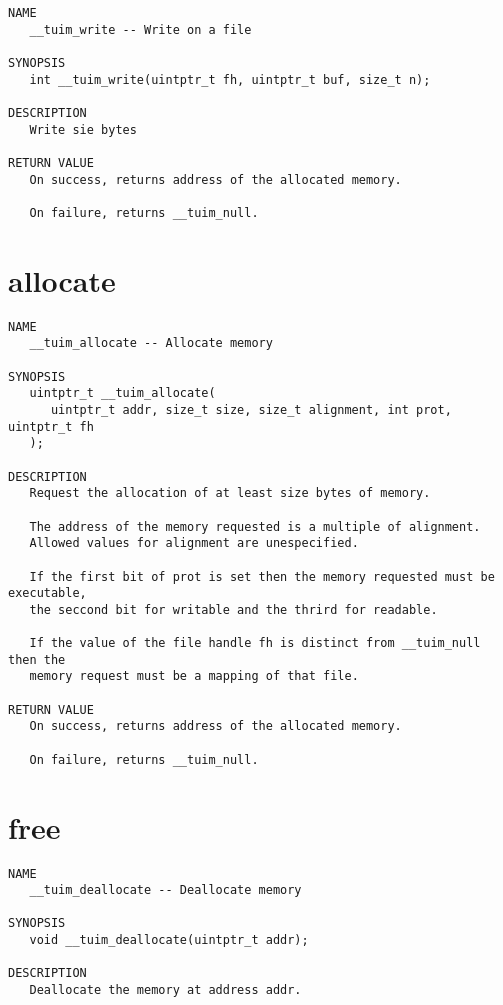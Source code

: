 \documentclass[
   12pt,                         %
   openright,                    %
   twoside,                      %
   a4paper,                      %
   sumario = tradicional,        %
   english,                      %
   xcolor=table                  %
]{abntex2}
\begin{document}
\begin{verbatim}
NAME
   __tuim_write -- Write on a file

SYNOPSIS
   int __tuim_write(uintptr_t fh, uintptr_t buf, size_t n);

DESCRIPTION
   Write sie bytes

RETURN VALUE
   On success, returns address of the allocated memory.

   On failure, returns __tuim_null.
\end{verbatim}

\newpage
\section{allocate}

\begin{verbatim}
NAME
   __tuim_allocate -- Allocate memory

SYNOPSIS
   uintptr_t __tuim_allocate(
      uintptr_t addr, size_t size, size_t alignment, int prot, uintptr_t fh
   );

DESCRIPTION
   Request the allocation of at least size bytes of memory.

   The address of the memory requested is a multiple of alignment.
   Allowed values for alignment are unespecified.

   If the first bit of prot is set then the memory requested must be executable,
   the seccond bit for writable and the thrird for readable.

   If the value of the file handle fh is distinct from __tuim_null then the
   memory request must be a mapping of that file.

RETURN VALUE
   On success, returns address of the allocated memory.

   On failure, returns __tuim_null.
\end{verbatim}

\newpage
\section{free}

\begin{verbatim}
NAME
   __tuim_deallocate -- Deallocate memory

SYNOPSIS
   void __tuim_deallocate(uintptr_t addr);

DESCRIPTION
   Deallocate the memory at address addr.
\end{verbatim}
\end{document}
